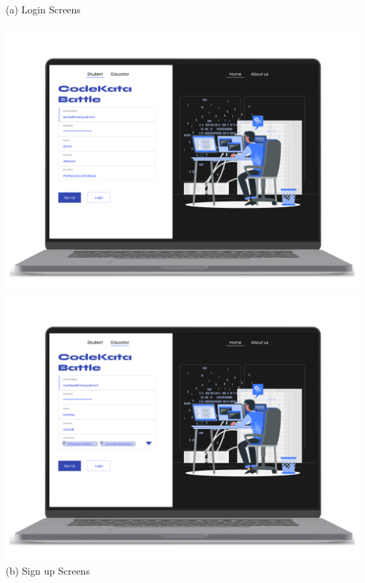     \begin{center}
        (a) Login Screens
    \end{center}
\begin{center}
    \includegraphics[scale=0.13]{Images/ui-ux/login-signup/student_signup.png}
    \includegraphics[scale=0.13]{Images/ui-ux/login-signup/educator_signup.png}
    (b) Sign up Screens
\end{center}
\newpage
